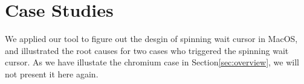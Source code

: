 \section{Case Studies} \label{sec:casestudy}
We applied our tool to figure out the desgin of spinning wait cursor in MacOS,
and illustrated the root causes for two cases who triggered the spinning wait cursor.
As we have illustate the chromium case in Section\ref{sec:overview}, we will not
present it here again.






%
